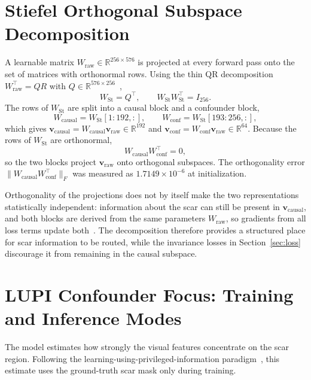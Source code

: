 \section{Stiefel Orthogonal Subspace Decomposition}
A learnable matrix $W_{\text{raw}} \in \mathbb{R}^{256 \times 576}$ is projected at every forward pass onto the set of matrices with orthonormal rows. Using the thin QR decomposition $W_{\text{raw}}^{\top} = QR$ with $Q \in \mathbb{R}^{576 \times 256}$~\cite{edelman1998},
\begin{equation}
W_{\text{St}} = Q^{\top}, \qquad W_{\text{St}} W_{\text{St}}^{\top} = I_{256}.
\end{equation}
The rows of $W_{\text{St}}$ are split into a causal block and a confounder block,
\begin{equation}
W_{\text{causal}} = W_{\text{St}}[1{:}192, :], \qquad W_{\text{conf}} = W_{\text{St}}[193{:}256, :],
\end{equation}
which gives $\mathbf{v}_{\text{causal}} = W_{\text{causal}}\mathbf{v}_{\text{raw}} \in \mathbb{R}^{192}$ and $\mathbf{v}_{\text{conf}} = W_{\text{conf}}\mathbf{v}_{\text{raw}} \in \mathbb{R}^{64}$. Because the rows of $W_{\text{St}}$ are orthonormal,
\begin{equation}
W_{\text{causal}} W_{\text{conf}}^{\top} = 0,
\end{equation}
so the two blocks project $\mathbf{v}_{\text{raw}}$ onto orthogonal subspaces. The orthogonality error $\|W_{\text{causal}} W_{\text{conf}}^{\top}\|_F$ was measured as $1.7149 \times 10^{-6}$ at initialization.

Orthogonality of the projections does not by itself make the two representations statistically independent: information about the scar can still be present in $\mathbf{v}_{\text{causal}}$, and both blocks are derived from the same parameters $W_{\text{raw}}$, so gradients from all loss terms update both~\cite{sarhan2020, huang2018}. The decomposition therefore provides a structured place for scar information to be routed, while the invariance losses in Section~\ref{sec:loss} discourage it from remaining in the causal subspace.

\section{LUPI Confounder Focus: Training and Inference Modes}
The model estimates how strongly the visual features concentrate on the scar region. Following the learning-using-privileged-information paradigm~\cite{vapnik2009, vapnik2015}, this estimate uses the ground-truth scar mask only during training.


